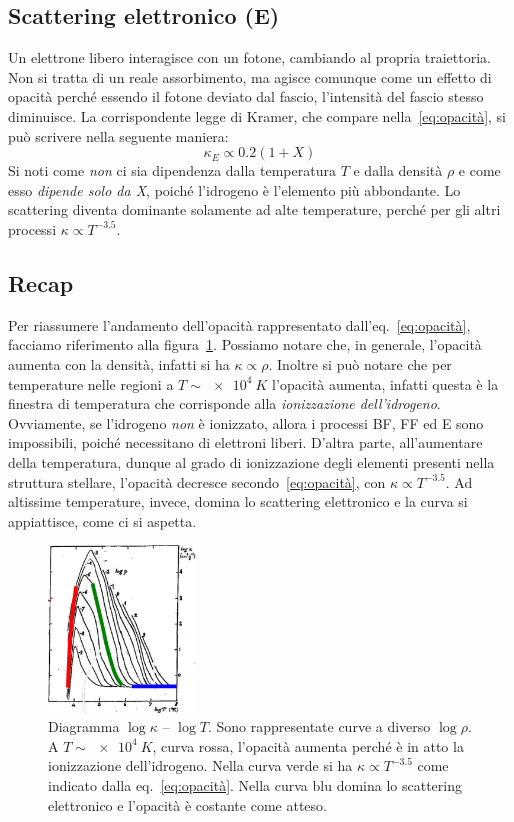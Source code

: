 \subsection{Scattering elettronico (E)}\label{sec:electron-scattering}
Un elettrone libero interagisce con un fotone, cambiando al propria traiettoria. Non si tratta di un reale assorbimento, ma agisce comunque come un effetto di opacità perché essendo il fotone deviato dal fascio, l'intensità del fascio stesso diminuisce. La corrispondente legge di Kramer, che compare nella~\eqref{eq:opacità}, si può scrivere nella seguente maniera:
\begin{equation}
    \kappa_E \propto 0.2(1+X)
\end{equation}
Si noti come \emph{non} ci sia dipendenza dalla temperatura $T$ e dalla densità $\rho$ e come esso \emph{dipende solo da X}, poiché l'idrogeno è l'elemento più abbondante. Lo scattering diventa dominante solamente ad alte temperature, perché per gli altri processi $\kappa \propto T^{-3.5}$.

\subsection{Recap}
Per riassumere l'andamento dell'opacità rappresentato dall'eq.~\eqref{eq:opacità}, facciamo riferimento alla figura~\ref{fig:opacità}. Possiamo notare che, in generale, l'opacità aumenta con la densità, infatti si ha $\kappa \propto \rho$. Inoltre si può notare che per temperature nelle regioni a $T \sim \SI{e4}{K}$ l'opacità aumenta, infatti questa è la finestra di temperatura che corrisponde alla \emph{ionizzazione dell'idrogeno}. Ovviamente, se l'idrogeno \emph{non} è ionizzato, allora i processi BF, FF ed E sono impossibili, poiché necessitano di elettroni liberi. D'altra parte, all'aumentare della temperatura, dunque al grado di ionizzazione degli elementi presenti nella struttura stellare, l'opacità decresce secondo~\eqref{eq:opacità}, con $\kappa \propto T^{-3.5}$. Ad altissime temperature, invece, domina lo scattering elettronico e la curva si appiattisce, come ci si  aspetta.

\begin{figure}
    \centering
    \includegraphics[width=0.35\textwidth]{immagini/opacita.jpg}
    \caption{Diagramma $\log \kappa$ -- $\log T$. Sono rappresentate curve a diverso $\log \rho$. A $T \sim \SI{e4}{K}$, curva rossa, l'opacità aumenta perché è in atto la ionizzazione dell'idrogeno. Nella curva verde si ha $\kappa \propto T^{-3.5}$ come indicato dalla eq.~\eqref{eq:opacità}. Nella curva blu domina lo scattering elettronico e l'opacità è costante come atteso.}
    \label{fig:opacità}
\end{figure}